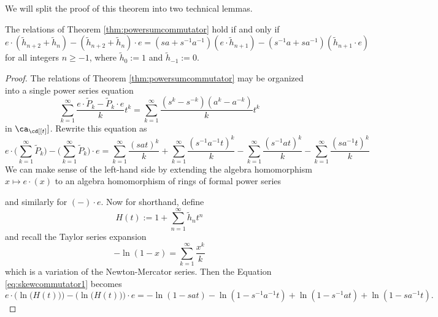 We will split the proof of this theorem into two technical lemmas.

\begin{lemma} \label{lem:powersumcommutator1}
The relations of Theorem \ref{thm:powersumcommutator} hold if and only if 
\begin{equation} \label{eq:skewcommutator1}
e \cdot (\tilde{h}_{n+2} + \tilde{h}_n) - (\tilde{h}_{n+2} + \tilde{h}_n) \cdot e = (sa + s^{-1}a^{-1}) (e \cdot \tilde{h}_{n+1}) - (s^{-1}a + sa^{-1}) (\tilde{h}_{n+1} \cdot e)
\end{equation}
for all integers $n \geq -1$, where $\tilde{h}_0 := 1$ and $\tilde{h}_{-1} := 0$.
\end{lemma}
\begin{proof}
The relations of Theorem \ref{thm:powersumcommutator} may be organized into a single power series equation
\begin{equation} \label{eq:skewcommutator1}
\sum_{k=1}^\infty \frac{e \cdot \tilde{P}_k - \tilde{P}_k \cdot e}{k} t^k = \sum_{k=1}^{\infty} \frac {(s^k - s^{-k}) (a^k - a^{-k})}{k} t^k
\end{equation}
in $\ca_\cd [[t]]$. Rewrite this equation as
\begin{equation} \label{eq:powersumcommutator2} 
e \cdot \Bigg( \sum_{k=1}^\infty \tilde{P}_k \Bigg) - \Bigg( \sum_{k=1}^\infty \tilde{P}_k \Bigg) \cdot e = \sum_{k=1}^{\infty} \frac {(sat)^k}{k} + \sum_{k=1}^{\infty} \frac {(s^{-1}a^{-1}t)^k}{k} - \sum_{k=1}^{\infty} \frac {(s^{-1}at)^k}{k} - \sum_{k=1}^{\infty} \frac {(sa^{-1}t)^k}{k}
\end{equation}
We can make sense of the left-hand side by extending the algebra homomorphism $x \mapsto e \cdot (x)$ to an algebra homomorphism of rings of formal power series
\begin{center}
\end{center}
and similarly for $(-) \cdot e$. Now for shorthand, define 
\[
H(t) := 1 + \sum_{n=1}^\infty \tilde{h}_n t^n
\]
and recall the Taylor series expansion
\[
-\ln(1-x) = \sum_{k=1}^\infty \frac{x^k}{k}
\]
which is a variation of the Newton-Mercator series. Then the Equation \eqref{eq:skewcommutator1} becomes
\begin{equation} \label{eq:powersumcommutator3} 
e \cdot \Big( \ln\big(H(t)\big) \Big) - \Big( \ln \big(H(t)\big) \Big) \cdot e = - \ln(1 - sat) - \ln(1 - s^{-1}a^{-1}t) + \ln(1 - s^{-1}at) + \ln(1 - sa^{-1}t).

\end{equation}
\end{proof}

